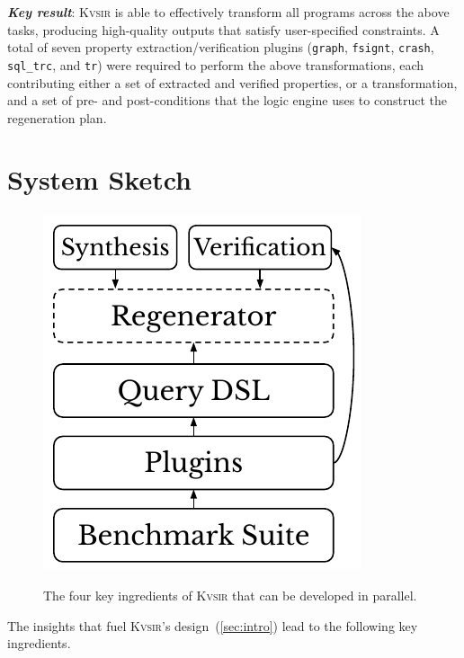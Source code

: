 \documentclass[sigplan,review,anonymous,10pt]{acmart}
\newcommand{\sys}{{\scshape Kv{\textalpha}sir}\xspace}
\newcommand{\heading}[1]{\vspace{2pt}\noindent\textbf{\emph{#1}}:\enspace}
\newcommand{\ttt}[1]{\texttt{#1}\xspace}
\begin{document}
\heading{Key result}
\sys is able to effectively transform all programs across the above tasks,
producing high-quality outputs that satisfy user-specified constraints.
A total
of seven property extraction/verification plugins (\ttt{graph}, \ttt{fsignt}, \ttt{crash}, \ttt{sql\_trc}, and \ttt{tr})
were required to perform the above transformations, each
contributing either a set of extracted and verified properties, or a
transformation, and a set of pre- and post-conditions that the logic engine
uses to construct the regeneration plan.

\section{System Sketch}
\label{sec:design}

\begin{figure}
  \includegraphics[width=.4\columnwidth]{figs/kvasir_levels.pdf}
  \label{fig:levels}
  \caption{The four key ingredients 
  of \sys that can be developed in parallel.}
\end{figure}
The insights that fuel \sys's design~(\cref{sec:intro}) lead to the following key ingredients.


\end{document}
